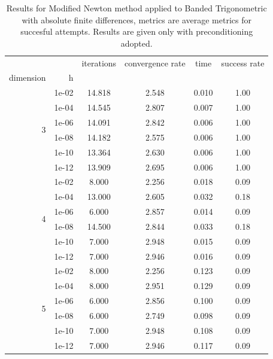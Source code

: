\begin{table}
\centering
\caption{Results for Modified Newton method applied to Banded Trigonometric with absolute finite differences, metrics are average metrics for succesful attempts. Results are given only with preconditioning adopted.}
\label{tab:Modified_Newton_Banded_Trigonometric_fd_abs}
\begin{tabular}{rr|cccc}
\toprule
    &  & iterations & convergence rate & time & success rate \\
dimension & h &  &  &  &  \\
\midrule
\multirow[t]{6}{*}{3} & 1e-02 & 14.818 & 2.548 & 0.010 & 1.00 \\
    & 1e-04 & 14.545 & 2.807 & 0.007 & 1.00 \\
    & 1e-06 & 14.091 & 2.842 & 0.006 & 1.00 \\
    & 1e-08 & 14.182 & 2.575 & 0.006 & 1.00 \\
    & 1e-10 & 13.364 & 2.630 & 0.006 & 1.00 \\
    & 1e-12 & 13.909 & 2.695 & 0.006 & 1.00 \\
\cline{1-6}
\multirow[t]{6}{*}{4} & 1e-02 & 8.000 & 2.256 & 0.018 & 0.09 \\
    & 1e-04 & 13.000 & 2.605 & 0.032 & 0.18 \\
    & 1e-06 & 6.000 & 2.857 & 0.014 & 0.09 \\
    & 1e-08 & 14.500 & 2.844 & 0.033 & 0.18 \\
    & 1e-10 & 7.000 & 2.948 & 0.015 & 0.09 \\
    & 1e-12 & 7.000 & 2.946 & 0.016 & 0.09 \\
\cline{1-6}
\multirow[t]{6}{*}{5} & 1e-02 & 8.000 & 2.256 & 0.123 & 0.09 \\
    & 1e-04 & 8.000 & 2.951 & 0.129 & 0.09 \\
    & 1e-06 & 6.000 & 2.856 & 0.100 & 0.09 \\
    & 1e-08 & 6.000 & 2.749 & 0.098 & 0.09 \\
    & 1e-10 & 7.000 & 2.948 & 0.108 & 0.09 \\
    & 1e-12 & 7.000 & 2.946 & 0.117 & 0.09 \\
\cline{1-6}
\bottomrule
\end{tabular}
\end{table}

